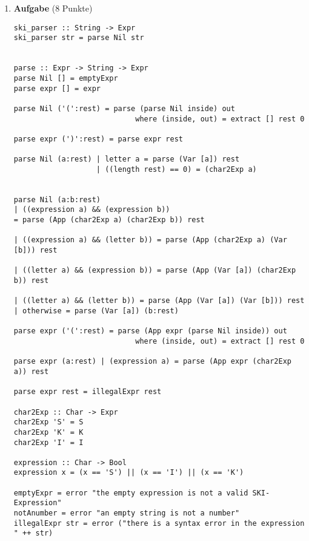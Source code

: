 \documentclass[11pt]{article}
\newcommand{\punkte}[1]{{\small{ }(#1 Punkte)}}
\newcommand{\aufgabe}[1]{\item{\bf #1}}
\begin{document}
\begin{enumerate}
\aufgabe{Aufgabe}\punkte{8}\\
\begin{lstlisting}
ski_parser :: String -> Expr
ski_parser str = parse Nil str


parse :: Expr -> String -> Expr
parse Nil [] = emptyExpr
parse expr [] = expr

parse Nil ('(':rest) = parse (parse Nil inside) out
                            where (inside, out) = extract [] rest 0

parse expr (')':rest) = parse expr rest

parse Nil (a:rest) | letter a = parse (Var [a]) rest
                   | ((length rest) == 0) = (char2Exp a)


parse Nil (a:b:rest) 
| ((expression a) && (expression b)) 
= parse (App (char2Exp a) (char2Exp b)) rest
                     
| ((expression a) && (letter b)) = parse (App (char2Exp a) (Var [b])) rest
                     
| ((letter a) && (expression b)) = parse (App (Var [a]) (char2Exp b)) rest
                     
| ((letter a) && (letter b)) = parse (App (Var [a]) (Var [b])) rest
| otherwise = parse (Var [a]) (b:rest)

parse expr ('(':rest) = parse (App expr (parse Nil inside)) out
                            where (inside, out) = extract [] rest 0

parse expr (a:rest) | (expression a) = parse (App expr (char2Exp a)) rest

parse expr rest = illegalExpr rest

char2Exp :: Char -> Expr
char2Exp 'S' = S
char2Exp 'K' = K
char2Exp 'I' = I

expression :: Char -> Bool
expression x = (x == 'S') || (x == 'I') || (x == 'K')

emptyExpr = error "the empty expression is not a valid SKI-Expression"
notAnumber = error "an empty string is not a number"
illegalExpr str = error ("there is a syntax error in the expression  " ++ str)
\end{lstlisting}

\end{enumerate}
\end{document}
